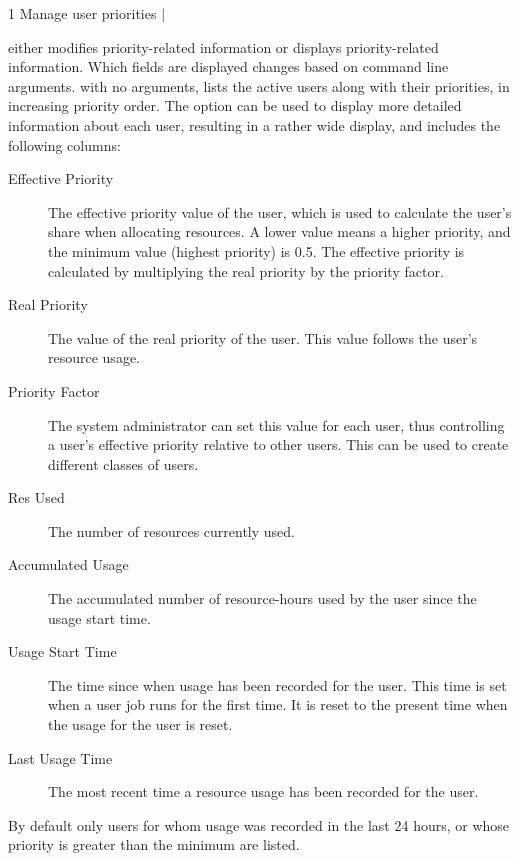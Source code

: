 \begin{ManPage}{\label{man-condor-userprio}}{1}
{Manage user priorities} 
\Synopsis {}
 $|$ 


\Description 
{} either modifies priority-related information
or displays priority-related information.
Which fields are displayed changes based on command line arguments.
 with no arguments, 
lists the active users along with their priorities,
in increasing priority order. 
The  option can be used to display
more detailed information about each user, 
resulting in a rather wide display,
and includes the following columns:

\begin{description}
\item[Effective Priority] The effective priority value of the user, 
which is used to calculate the user's share when allocating resources. 
A lower value means a higher priority, 
and the minimum value (highest priority) is 0.5. 
The effective priority is
calculated by multiplying the real priority by the priority factor.
\item[Real Priority] The value of the real priority of the user. 
This value follows the user's resource usage.
\item[Priority Factor] The system administrator can set this value 
for each user, 
thus controlling a user's effective priority relative to other users. 
This can be used to create different classes of users.
\item[Res Used] The number of resources currently used. 
\item[Accumulated Usage] The accumulated number of resource-hours 
used by the user since the usage start time.
\item[Usage Start Time] The time since when usage has been recorded 
for the user. 
This time is set when a user job runs for the first time. 
It is reset to the present time when the
usage for the user is reset.
\item[Last Usage Time] The most recent time a resource usage has been recorded 
for the user.
\end{description}

By default only users for whom usage was recorded in the last 24 hours, 
or whose priority is greater than the minimum are listed.


\end{ManPage}
